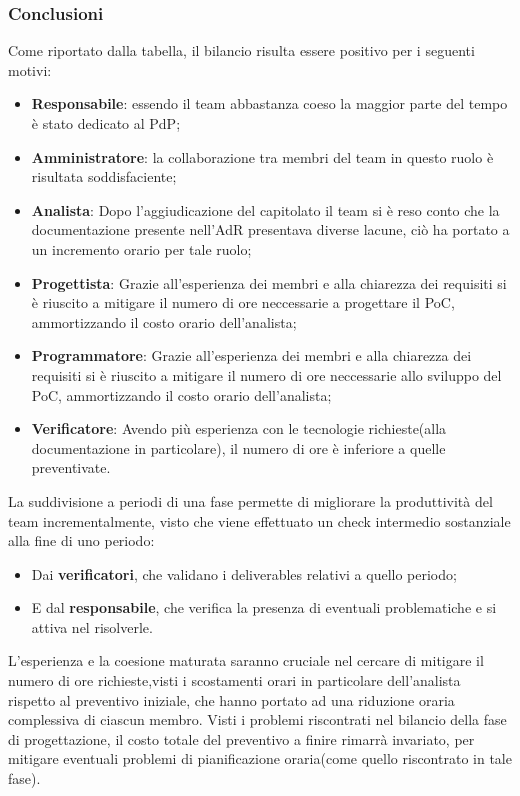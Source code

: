 \subsubsection{Conclusioni}
Come riportato dalla tabella, il bilancio risulta essere positivo per i seguenti motivi:
\begin{itemize}
	\item \textbf{Responsabile}: {essendo il team abbastanza coeso la maggior parte del tempo è stato dedicato al PdP;}
	\item \textbf{Amministratore}: {la collaborazione tra membri del team in questo ruolo è risultata soddisfaciente;}
	\item \textbf{Analista}: {Dopo l'aggiudicazione del capitolato il team si è reso conto che la documentazione presente nell'AdR presentava diverse lacune, ciò ha portato a un incremento orario per tale ruolo;}
	\item \textbf{Progettista}: {Grazie all'esperienza dei membri e alla chiarezza dei requisiti si è riuscito a mitigare il numero di ore neccessarie a progettare il PoC, ammortizzando il costo orario dell'analista;}
	\item \textbf{Programmatore}: {Grazie all'esperienza dei membri e alla chiarezza dei requisiti si è riuscito a mitigare il numero di ore neccessarie allo sviluppo del PoC, ammortizzando il costo orario dell'analista;}
	\item \textbf{Verificatore}: {Avendo più esperienza con le tecnologie richieste(alla documentazione in particolare), il numero di ore è inferiore a quelle preventivate.}
\end{itemize}
La suddivisione a periodi di una fase permette di migliorare la produttività del team incrementalmente, visto che viene effettuato un check intermedio sostanziale alla fine di uno periodo:
\begin{itemize}
	\item Dai \textbf{verificatori}, che validano i deliverables relativi a quello periodo;
	\item E dal \textbf{responsabile}, che verifica la presenza di eventuali problematiche e si attiva nel risolverle.
\end{itemize}
L'esperienza e la coesione maturata saranno cruciale nel cercare di mitigare il numero di ore richieste,visti i scostamenti orari in particolare dell'analista rispetto al preventivo iniziale, che hanno portato ad una riduzione oraria complessiva di ciascun membro.
Visti i problemi riscontrati nel bilancio della fase di progettazione, il costo totale del preventivo a finire rimarrà invariato, per mitigare eventuali problemi di pianificazione oraria(come quello riscontrato in tale fase).
